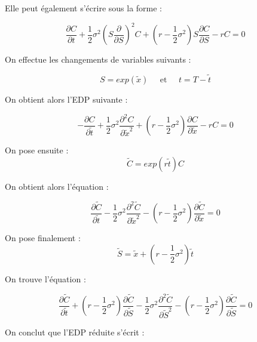 \documentclass[11pt,a4paper]{article}
\begin{document}
\vspace{0.2cm}

Elle peut également s'écrire sous la forme :

$$\frac{\partial C}{\partial t} + \frac{1}{2} \sigma^2 (S \frac{\partial}{\partial S})^2 C + (r - \frac{1}{2} \sigma^2) S \frac{\partial C}{\partial S} - r C = 0$$

\vspace{0.2cm}

On effectue les changements de variables suivants :  

$$S = exp(\widetilde{x}) \;\;\;\;\; \text{et} \;\;\;\;\; t = T - \widetilde{t}$$

\vspace{0.2cm}

On obtient alors l'EDP suivante :

$$-\frac{\partial C}{\partial \widetilde{t}} + \frac{1}{2} \sigma^2 \frac{\partial^2 C}{\partial \widetilde{x}^2} + (r - \frac{1}{2} \sigma^2) \frac{\partial C}{\partial \widetilde{x}} - r C = 0$$

\vspace{0.2cm}

On pose ensuite : $$\widetilde{C} = exp(r \widetilde{t}) C$$

\vspace{0.2cm}

On obtient alors l'équation :

$$ \frac{\partial \widetilde{C}}{\partial \widetilde{t}} - \frac{1}{2} \sigma^2   \frac{\partial^{2} \widetilde{C}}{\partial \widetilde{x}^{2}} - (r - \frac{1}{2} \sigma^2)\frac{\partial \widetilde{C}}{\partial \widetilde{x}} = 0 $$

\vspace{0.2cm}

On pose finalement : $$\widetilde{S} = \widetilde{x} + (r - \frac{1}{2} \sigma^2) \widetilde{t}$$

\vspace{0.2cm}

On trouve l'équation :

$$ \frac{\partial \widetilde{C}}{\partial \widetilde{t}} + (r - \frac{1}{2} \sigma^2)\frac{\partial \widetilde{C}}{\partial \widetilde{S}} - \frac{1}{2} \sigma^2 \frac{\partial^{2} \widetilde{C}}{\partial \widetilde{S}^{2}} - (r - \frac{1}{2} \sigma^2)\frac{\partial \widetilde{C}}{\partial \widetilde{S}} = 0 $$

\vspace{0.2cm}

On conclut que l'EDP réduite s'écrit :
\end{document}
